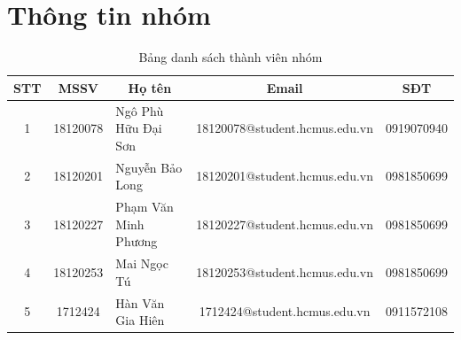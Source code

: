 \documentclass[a4paper, 12pt]{article}
\begin{document}
    \section{Thông tin nhóm}
    \begin{table}[H]
        \begin{tabular}{|c|c|l|c|c|}
        \hline
        STT & MSSV     & \multicolumn{1}{c|}{Họ tên} & Email                         & SĐT        \\ \hline
        1   & 18120078 & Ngô Phù Hữu Đại Sơn         & 18120078@student.hcmus.edu.vn & 0919070940 \\ \hline
        2   & 18120201 & Nguyễn Bảo Long             & 18120201@student.hcmus.edu.vn & 0981850699 \\ \hline
        3   & 18120227 & Phạm Văn Minh Phương             & 18120227@student.hcmus.edu.vn & 0981850699 \\ \hline
        4   & 18120253 & Mai Ngọc Tú             & 18120253@student.hcmus.edu.vn & 0981850699 \\ \hline
        5   & 1712424 & Hàn Văn Gia Hiên            & 1712424@student.hcmus.edu.vn & 0911572108 \\ \hline
        \end{tabular}
        \caption{Bảng danh sách thành viên nhóm}
    \end{table}

    \clearpage
\end{document}
